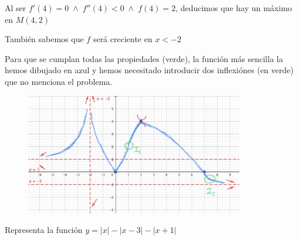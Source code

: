 \begin{proofw}\renewcommand{\qedsymbol}{$\diamond$}	

Al ser $f'(4)=0\; \wedge \; f''(4)<0 \; \wedge \; f(4)=2$, deducimos que hay un máximo en $M(4,2)$

También sabemos que $f$ será creciente en $x<-2$

Para que se cumplan todas las propiedades (verde), la función más sencilla la hemos dibujado en azul y hemos necesitado introducir dos inflexiónes (en verde) que no menciona el problema.

	\begin{figure}[H]
		\centering
		\includegraphics[width=0.85\textwidth]{imagenes/imagenes05/T05IM35.png}
	\end{figure}
	
\end{proofw}


\begin{ejre} Representa la función $y=|x|-|x-3|-|x+1|$
	
\end{ejre}

